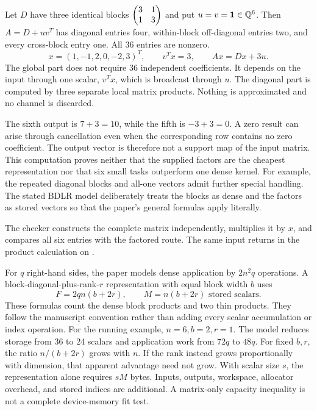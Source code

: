 Let $D$ have three identical blocks $\begin{pmatrix}3&1\\1&3\end{pmatrix}$ and put $u=v=\mathbf{1}\in\mathbb Q^6$. Then $A=D+uv^T$ has diagonal entries four, within-block off-diagonal entries two, and every cross-block entry one. All 36 entries are nonzero.
\[
x=(1,-1,2,0,-2,3)^T,\qquad v^Tx=3,\qquad Ax=Dx+3u.
\]
The global part does not require 36 independent coefficients. It depends on the input through one scalar, $v^Tx$, which is broadcast through $u$. The diagonal part is computed by three separate local matrix products. Nothing is approximated and no channel is discarded.

The sixth output is $7+3=10$, while the fifth is $-3+3=0$. A zero result can arise through cancellation even when the corresponding row contains no zero coefficient. The output vector is therefore not a support map of the input matrix.
This computation proves neither that the supplied factors are the cheapest representation nor that six small tasks outperform one dense kernel. For example, the repeated diagonal blocks and all-one vectors admit further special handling. The stated BDLR model deliberately treats the blocks as dense and the factors as stored vectors so that the paper's general formulas apply literally.

The checker constructs the complete matrix independently, multiplies it by $x$, and compares all six entries with the factored route. The same input returns in the product calculation on .

For $q$ right-hand sides, the paper models dense application by $2n^2q$ operations. A block-diagonal-plus-rank-$r$ representation with equal block width $b$ uses
\[
F=2qn(b+2r),\qquad M=n(b+2r)\text{ stored scalars}.
\]
These formulas count the dense block products and two thin products. They follow the manuscript convention rather than adding every scalar accumulation or index operation.
For the running example, $n=6,b=2,r=1$. The model reduces storage from 36 to 24 scalars and application work from $72q$ to $48q$. For fixed $b,r$, the ratio $n/(b+2r)$ grows with $n$. If the rank instead grows proportionally with dimension, that apparent advantage need not grow.
With scalar size $s$, the representation alone requires $sM$ bytes. Inputs, outputs, workspace, allocator overhead, and stored indices are additional. A matrix-only capacity inequality is not a complete device-memory fit test.

